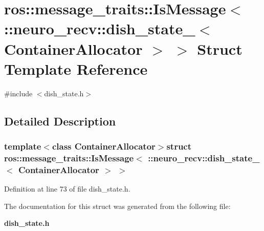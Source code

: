 \section{ros\-:\-:message\-\_\-traits\-:\-:\-Is\-Message$<$ \-:\-:neuro\-\_\-recv\-:\-:dish\-\_\-state\-\_\-$<$ \-Container\-Allocator $>$ $>$ \-Struct \-Template \-Reference}
\label{structros_1_1message__traits_1_1IsMessage_3_01_1_1neuro__recv_1_1dish__state___3_01ContainerAllocator_01_4_01_4}


{\ttfamily \#include $<$dish\-\_\-state.\-h$>$}



\subsection{\-Detailed \-Description}
\subsubsection*{template$<$class Container\-Allocator$>$struct ros\-::message\-\_\-traits\-::\-Is\-Message$<$ \-::neuro\-\_\-recv\-::dish\-\_\-state\-\_\-$<$ Container\-Allocator $>$ $>$}



\-Definition at line 73 of file dish\-\_\-state.\-h.



\-The documentation for this struct was generated from the following file\-:\begin{DoxyCompactItemize}
\item 
{\bf dish\-\_\-state.\-h}\end{DoxyCompactItemize}

